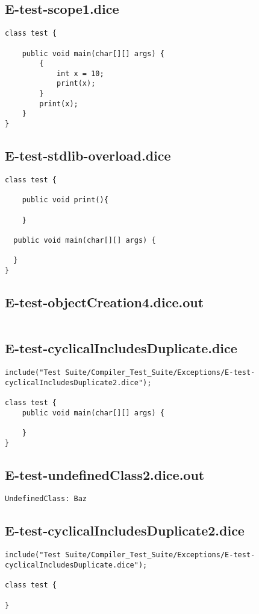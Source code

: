 \subsection{E-test-scope1.dice}
\begin{verbatim}
class test {

	public void main(char[][] args) {
		{
			int x = 10;
			print(x);
		}
		print(x);
	}
}
\end{verbatim}
\pagebreak
\subsection{E-test-stdlib-overload.dice}
\begin{verbatim}
class test {

	public void print(){

	}

  public void main(char[][] args) {
     
  }
}
\end{verbatim}
\pagebreak
\subsection{E-test-objectCreation4.dice.out}
\begin{verbatim}

\end{verbatim}
\pagebreak
\subsection{E-test-cyclicalIncludesDuplicate.dice}
\begin{verbatim}
include("Test Suite/Compiler_Test_Suite/Exceptions/E-test-cyclicalIncludesDuplicate2.dice");

class test {
	public void main(char[][] args) {
        
	}
}

\end{verbatim}
\pagebreak
\subsection{E-test-undefinedClass2.dice.out}
\begin{verbatim}
UndefinedClass: Baz

\end{verbatim}
\pagebreak
\subsection{E-test-cyclicalIncludesDuplicate2.dice}
\begin{verbatim}
include("Test Suite/Compiler_Test_Suite/Exceptions/E-test-cyclicalIncludesDuplicate.dice");

class test {
	
}

\end{verbatim}
\pagebreak
